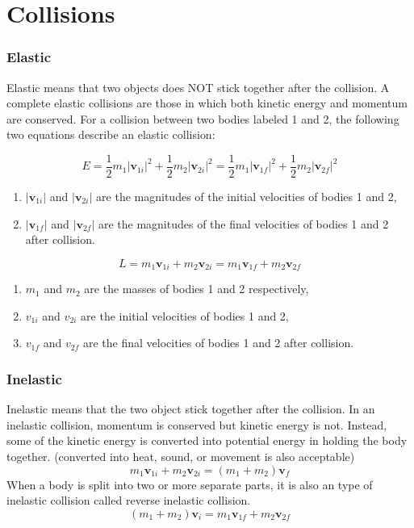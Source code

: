 \documentclass[]{article}
\begin{document}
\section{Collisions}
\subsubsection{Elastic}
Elastic means that two objects does NOT stick together after the collision. A complete elastic collisions are those in which both kinetic energy and momentum are conserved. For a collision between two bodies labeled 1 and 2, the following two equations describe an elastic collision:

$$E = \frac{1}{2} m_1 |\mathbf{v}_{1i}|^2 + \frac{1}{2} m_2 |\mathbf{v}_{2i}|^2 = \frac{1}{2} m_1 |\mathbf{v}_{1f}|^2 + \frac{1}{2} m_2 |\mathbf{v}_{2f}|^2$$

\begin{enumerate}
	\item $|\mathbf{v}_{1i}|$ and $|\mathbf{v}_{2i}|$ are the magnitudes of the initial velocities of bodies 1 and 2,

	\item $|\mathbf{v}_{1f}|$ and $|\mathbf{v}_{2f}|$ are the magnitudes of the final velocities of bodies 1 and 2 after collision.

\end{enumerate}
$$L = m_1 \mathbf{v}_{1i} + m_2 \mathbf{v}_{2i} = m_1 \mathbf{v}_{1f} + m_2 \mathbf{v}_{2f}$$

\begin{enumerate}
\item $m_1$ and $m_2$ are the masses of bodies 1 and 2 respectively,

\item $v_{1i}$ and $v_{2i}$ are the initial velocities of bodies 1 and 2,

\item $v_{1f}$ and $v_{2f}$ are the final velocities of bodies 1 and 2 after collision.
  
\end{enumerate}
\subsubsection{Inelastic}
Inelastic means that the two object stick together after the collision. In an inelastic collision, momentum is conserved but kinetic energy is not. Instead, some of the kinetic energy is converted into potential energy in holding the body together. (converted into heat, sound, or movement is also acceptable)
$$m_1 \mathbf{v}_{1i} + m_2 \mathbf{v}_{2i} = (m_1 +m_2)\mathbf{v}_{f}$$
When a body is split into two or more separate parts, it is also an type of inelastic collision called reverse inelastic collision. 
$$(m_1 +m_2)\mathbf{v}_{i} = m_1 \mathbf{v}_{1f} + m_2 \mathbf{v}_{2f} $$
\end{document}
